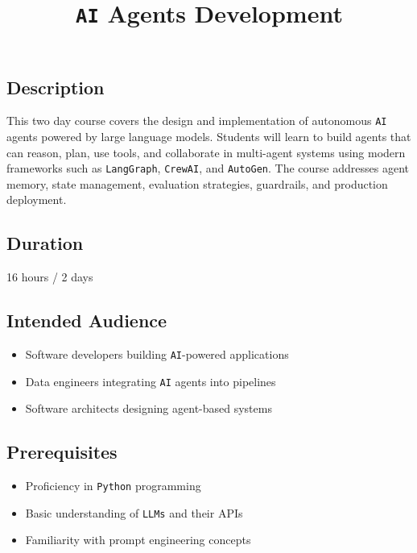 \documentclass[
]{article}
\title{\texttt{AI} Agents Development}
\author{}
\date{}
\providecommand{\tightlist}{%
  \setlength{\itemsep}{0pt}\setlength{\parskip}{0pt}}
\begin{document}
\maketitle

\subsection{Description}\label{description}

This two day course covers the design and implementation of autonomous
\texttt{AI} agents powered by large language models. Students will learn
to build agents that can reason, plan, use tools, and collaborate in
multi-agent systems using modern frameworks such as \texttt{LangGraph},
\texttt{CrewAI}, and \texttt{AutoGen}. The course addresses agent
memory, state management, evaluation strategies, guardrails, and
production deployment.

\subsection{Duration}\label{duration}

16 hours / 2 days

\subsection{Intended Audience}\label{intended-audience}

\begin{itemize}
\tightlist
\item
  Software developers building \texttt{AI}-powered applications
\item
  Data engineers integrating \texttt{AI} agents into pipelines
\item
  Software architects designing agent-based systems
\end{itemize}

\subsection{Prerequisites}\label{prerequisites}

\begin{itemize}
\tightlist
\item
  Proficiency in \texttt{Python} programming
\item
  Basic understanding of \texttt{LLMs} and their APIs
\item
  Familiarity with prompt engineering concepts
\end{itemize}
\end{document}
